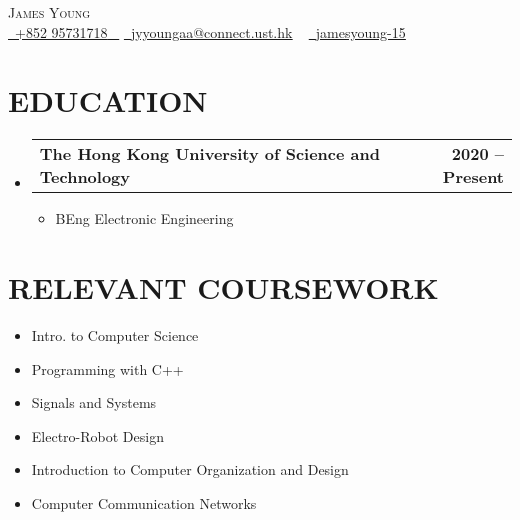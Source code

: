 \documentclass[letterpaper,11pt]{article}
\makeatletter
\newcommand{\resumeItem}[1]{
  \item\small{
    {#1 \vspace{-2pt}}
  }
}
\newcommand{\resumeSubheading}[4]{
  \vspace{-2pt}\item
    \begin{tabular*}{1.0\textwidth}[t]{l@{\extracolsep{\fill}}r}
      \textbf{\large#1} & \textbf{\small #2} \\
    \end{tabular*}\vspace{-7pt}
}
\newcommand{\resumeSubHeadingListStart}{\begin{itemize}[leftmargin=0.0in, label={}]}
\newcommand{\resumeSubHeadingListEnd}{\end{itemize}}
\newcommand{\resumeItemListStart}{\begin{itemize}}
\newcommand{\resumeItemListEnd}{\end{itemize}\vspace{-5pt}}
\makeatother
\begin{document}


\begin{center}
    {\Huge \scshape James Young} \\ \vspace{1pt}
    \small \href{tel:+85295731718}{ \raisebox{-0.1\height}\faPhone\ \underline{+852 95731718} ~} \href{mailto:jyyoungaa@connect.ust.hk}{\raisebox{-0.2\height}\faEnvelope\  \underline{jyyoungaa@connect.ust.hk}} ~ 
    \href{https://github.com/jamesyoung-15}{\raisebox{-0.2\height}\faGithub\ \underline{jamesyoung-15}} ~
\end{center}

\section{EDUCATION}
  \resumeSubHeadingListStart
    \resumeSubheading
      {The Hong Kong University of Science and Technology}{2020 -- Present}
      {}{}
        \resumeItemListStart
            \resumeItem{\normalsize{BEng Electronic Engineering}}
        \resumeItemListEnd  
  \resumeSubHeadingListEnd

\section{RELEVANT COURSEWORK}
    \begin{multicols}{2}
        \begin{itemize}[itemsep=-2pt, parsep=5pt]
        \small
            \item Intro. to Computer Science
            \item Programming with C++
            \item Signals and Systems
            \item Electro-Robot Design
            \item Introduction to Computer Organization and Design
            \item Computer Communication Networks
        \end{itemize}
    \end{multicols}
        \vspace*{2.0\multicolsep}
\vspace{5pt}
\end{document}
